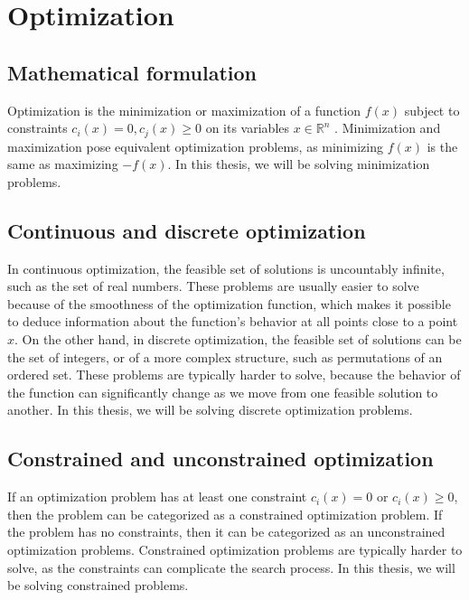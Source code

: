 \section{Optimization}
\label{sec:optimization}

\subsection{Mathematical formulation}
\label{sec:mathematical_formulation}
Optimization is the minimization or maximization of a function $f(x)$ subject to constraints $c_i(x) = 0, c_j(x) \ge 0$ on its variables $x \in \mathbb{R}^n$ \citep{nocedal2006numericaloptimization}. Minimization and maximization pose equivalent optimization problems, as minimizing $f(x)$ is the same as maximizing $-f(x)$. In this thesis, we will be solving minimization problems.

\subsection{Continuous and discrete optimization}
\label{sec:continuous_and_discrete_optimization}
In continuous optimization, the feasible set of solutions is uncountably infinite, such as the set of real numbers. These problems are usually easier to solve because of the smoothness of the optimization function, which makes it possible to deduce information about the function's behavior at all points close to a point $x$. On the other hand, in discrete optimization, the feasible set of solutions can be the set of integers, or of a more complex structure, such as permutations of an ordered set. These problems are typically harder to solve, because the behavior of the function can significantly change as we move from one feasible solution to another. In this thesis, we will be solving discrete optimization problems.

\subsection{Constrained and unconstrained optimization}
\label{sec:constrained_and_unconstrained_optimization}
If an optimization problem has at least one constraint $c_i(x) = 0$ or $c_i(x) \ge 0$, then the problem can be categorized as a constrained optimization problem. If the problem has no constraints, then it can be categorized as an unconstrained optimization problems. Constrained optimization problems are typically harder to solve, as the constraints can complicate the search process. In this thesis, we will be solving constrained problems.

